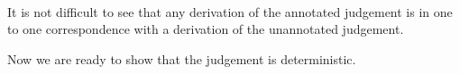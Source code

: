{\centering
{}}\\

It is not difficult to see that any derivation of the annotated judgement
is in one to one correspondence with a derivation of the unannotated 
judgement.

Now we are ready to show that the judgement is deterministic.\\

